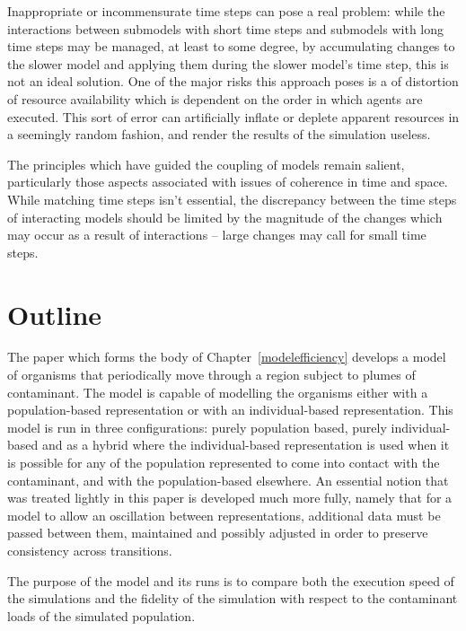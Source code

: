 Inappropriate or incommensurate time steps can pose a real problem:
while the interactions between submodels with short time steps and
submodels with long time steps may be managed, at least to some degree,
by accumulating changes to the slower model and applying them during
the slower model's time step,  this is not an ideal solution. One of
the major risks this approach poses is a of distortion of resource
availability which is dependent on the order in which agents are
executed. This sort of error can artificially inflate or deplete
apparent resources in a seemingly random fashion, and render the
results of the simulation useless.


The principles which have guided the coupling of models remain
salient, particularly those aspects associated with issues of
coherence in time and space. While matching time steps isn't essential,
the discrepancy between the time steps of interacting models should be
limited by the magnitude of the changes which may occur as a result of
interactions -- large changes may call for small time steps.

\section{Outline}
The paper which forms the body of Chapter~\ref{modelefficiency}
develops a model of organisms that periodically move through a region
subject to plumes of contaminant.  The model is capable of modelling
the organisms either with a population-based representation or with an
individual-based representation.  This model is run in three
configurations: purely population based, purely individual-based and
as a hybrid where the individual-based representation is used when it
is possible for any of the population represented to come into contact
with the contaminant, and with the population-based elsewhere. An
essential notion that was treated lightly in this paper is developed
much more fully, namely that for a model to allow an oscillation
between representations, additional data must be passed between them,
maintained and possibly adjusted in order to preserve consistency
across transitions.

The purpose of the model and its runs is to compare both the execution
speed of the simulations and the fidelity of the simulation with
respect to the contaminant loads of the simulated population.

